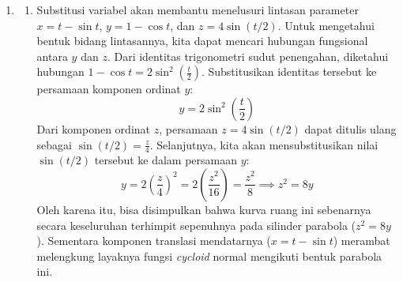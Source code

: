 \documentclass[11pt,letterpaper]{article}
\begin{document}
\begin{enumerate}
  \item \begin{enumerate}[label=\alph*.]
          \item Substitusi variabel akan membantu menelusuri lintasan parameter $x = t - \sin t$, $y = 1 - \cos t$, dan $z = 4\sin(t/2)$.
                Untuk mengetahui bentuk bidang lintasannya, kita dapat mencari hubungan fungsional antara $y$ dan $z$.
                Dari identitas trigonometri sudut penengahan, diketahui hubungan $1 - \cos t = 2\sin^2\left(\frac{t}{2}\right)$.
                Substitusikan identitas tersebut ke persamaan komponen ordinat $y$:
                \[ y = 2\sin^2\left(\frac{t}{2}\right) \]
                Dari komponen ordinat $z$, persamaan $z = 4\sin(t/2)$ dapat ditulis ulang sebagai $\sin(t/2) = \frac{z}{4}$.
                Selanjutnya, kita akan mensubstitusikan nilai $\sin(t/2)$ tersebut ke dalam persamaan $y$:
                \[ y = 2\left(\frac{z}{4}\right)^2 = 2\left(\frac{z^2}{16}\right) = \frac{z^2}{8} \implies z^2 = 8y \]
                Oleh karena itu, bisa disimpulkan bahwa kurva ruang ini sebenarnya secara keseluruhan terhimpit sepenuhnya pada silinder parabola ($z^2 = 8y$). Sementara komponen translasi mendatarnya ($x = t - \sin t$) merambat melengkung layaknya fungsi \textit{cycloid} normal mengikuti bentuk parabola ini.
                \begin{center}
\end{center}
\end{enumerate}
\end{enumerate}
\end{document}
